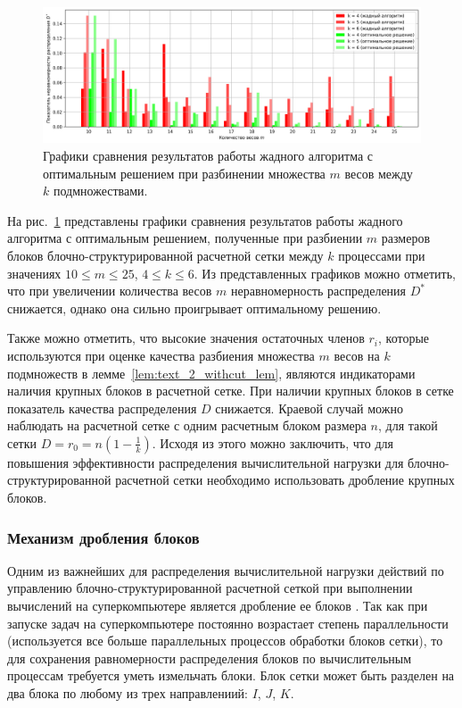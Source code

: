 \begin{figure}[ht]
\centering
\includegraphics[width=1.0\textwidth]{fig/par_blocks_distr_greedy_opt_cmp_graph.png}
\singlespacing
{}\caption{Графики сравнения результатов работы жадного алгоритма с оптимальным решением при разбинении множества $m$ весов между $k$ подмножествами.}
\label{fig:par_blocks_distr_greedy_opt_cmp_graph}
\end{figure}

На рис.~\ref{fig:par_blocks_distr_greedy_opt_cmp_graph} представлены графики сравнения результатов работы жадного алгоритма с оптимальным решением, полученные при разбиении $m$ размеров блоков блочно-структурированной расчетной сетки между $k$ процессами при значениях $10 \le m \le 25$, $4 \le k \le 6$.
Из представленных графиков можно отметить, что при увеличении количества весов $m$ неравномерность распределения $D^{*}$ снижается, однако она сильно проигрывает оптимальному решению.

Также можно отметить, что высокие значения остаточных членов $r_i$, которые используются при оценке качества разбиения множества $m$ весов на $k$ подмножеств в лемме~\ref{lem:text_2_withcut_lem}, являются индикаторами наличия крупных блоков в расчетной сетке.
При наличии крупных блоков в сетке показатель качества распределения $D$ снижается.
Краевой случай можно наблюдать на расчетной сетке с одним расчетным блоком размера $n$, для такой сетки $D = r_0 = n (1 - \frac{1}{k})$.
Исходя из этого можно заключить, что для повышения эффективности распределения вычислительной нагрузки для блочно-структурированной расчетной сетки необходимо использовать дробление крупных блоков.

\subsubsection{Механизм дробления блоков}

Одним из важнейших для распределения вычислительной нагрузки действий по управлению блочно-структурированной расчетной сеткой при выполнении вычислений на суперкомпьютере является дробление ее блоков \cite{Rybakov2016WithCut}.
Так как при запуске задач на суперкомпьютере постоянно возрастает степень параллельности (используется все больше параллельных процессов обработки блоков сетки), то для сохранения равномерности распределения блоков по вычислительным процессам требуется уметь измельчать блоки.
Блок сетки может быть разделен на два блока по любому из трех направлениий: $I$, $J$, $K$.

